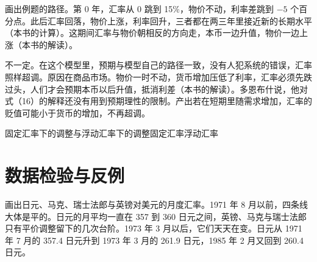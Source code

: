 画出例题的路径。第 0 年，汇率从 0 跳到 15\%，物价不动，利率差跳到 $-5$ 个百分点。此后汇率回落，物价上涨，利率回升，三者都在两三年里接近新的长期水平（本书的计算）。这期间汇率与物价朝相反的方向走，本币一边升值，物价一边上涨（本书的解读）。

\begin{pitfall}
不一定。在这个模型里，预期与模型自己的路径一致，没有人犯系统的错误，汇率照样超调。原因在商品市场。物价一时不动，货币增加压低了利率，汇率必须先跌过头，人们才会预期本币以后升值，抵消利差（本书的解读）。多恩布什说，他对式（16）的解释还没有用到预期理性的限制\cite{dornbusch1976}。产出若在短期里随需求增加，汇率的贬值可能小于货币的增加，不再超调\cite{dornbusch1976}。
\end{pitfall}

\begin{compare}{固定汇率下的调整与浮动汇率下的调整}{固定汇率}{浮动汇率}
\end{compare}

\section{数据检验与反例}\label{sec:floating-test}

画出日元、马克、瑞士法郎与英镑对美元的月度汇率。1971 年 8 月以前，四条线大体是平的。日元的月平均一直在 357 到 360 日元之间，英镑、马克与瑞士法郎只有平价调整留下的几次台阶\cite{bisdata46}。1973 年 3 月以后，它们天天在变。日元从 1971 年 7 月的 357.4 日元升到 1973 年 3 月的 261.9 日元，1985 年 2 月又回到 260.4 日元\cite{bisdata46}。


